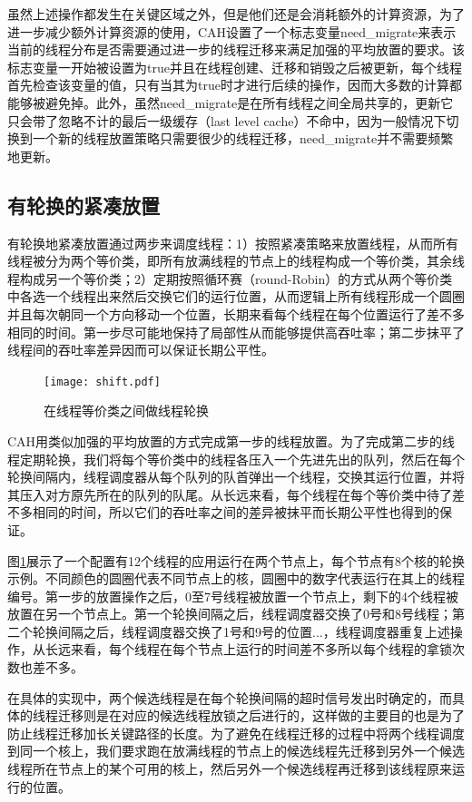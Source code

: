 虽然上述操作都发生在关键区域之外，但是他们还是会消耗额外的计算资源，为了进一步减少额外计算资源的使用，CAH设置了一个标志变量need\_migrate来表示当前的线程分布是否需要通过进一步的线程迁移来满足加强的平均放置的要求。该标志变量一开始被设置为true并且在线程创建、迁移和销毁之后被更新，每个线程首先检查该变量的值，只有当其为true时才进行后续的操作，因而大多数的计算都能够被避免掉。此外，虽然need\_migrate是在所有线程之间全局共享的，更新它只会带了忽略不计的最后一级缓存（last level cache）不命中，因为一般情况下切换到一个新的线程放置策略只需要很少的线程迁移，need\_migrate并不需要频繁地更新。
\subsection{有轮换的紧凑放置}
有轮换地紧凑放置通过两步来调度线程：1）按照紧凑策略来放置线程，从而所有线程被分为两个等价类，即所有放满线程的节点上的线程构成一个等价类，其余线程构成另一个等价类；2）定期按照循环赛（round-Robin）的方式从两个等价类中各选一个线程出来然后交换它们的运行位置，从而逻辑上所有线程形成一个圆圈并且每次朝同一个方向移动一个位置，长期来看每个线程在每个位置运行了差不多相同的时间。第一步尽可能地保持了局部性从而能够提供高吞吐率；第二步抹平了线程间的吞吐率差异因而可以保证长期公平性。
\begin{figure}[t]
	\centering
	\texttt{[image: shift.pdf]}
	\caption{在线程等价类之间做线程轮换}
	\label{Fig:shift}
\end{figure}

CAH用类似加强的平均放置的方式完成第一步的线程放置。为了完成第二步的线程定期轮换，我们将每个等价类中的线程各压入一个先进先出的队列，然后在每个轮换间隔内，线程调度器从每个队列的队首弹出一个线程，交换其运行位置，并将其压入对方原先所在的队列的队尾。从长远来看，每个线程在每个等价类中待了差不多相同的时间，所以它们的吞吐率之间的差异被抹平而长期公平性也得到的保证。

图\ref{Fig:shift}展示了一个配置有12个线程的应用运行在两个节点上，每个节点有8个核的轮换示例。不同颜色的圆圈代表不同节点上的核，圆圈中的数字代表运行在其上的线程编号。第一步的放置操作之后，0至7号线程被放置一个节点上，剩下的4个线程被放置在另一个节点上。第一个轮换间隔之后，线程调度器交换了0号和8号线程；第二个轮换间隔之后，线程调度器交换了1号和9号的位置...，线程调度器重复上述操作，从长远来看，每个线程在每个节点上运行的时间差不多所以每个线程的拿锁次数也差不多。

在具体的实现中，两个候选线程是在每个轮换间隔的超时信号发出时确定的，而具体的线程迁移则是在对应的候选线程放锁之后进行的，这样做的主要目的也是为了防止线程迁移加长关键路径的长度。为了避免在线程迁移的过程中将两个线程调度到同一个核上，我们要求跑在放满线程的节点上的候选线程先迁移到另外一个候选线程所在节点上的某个可用的核上，然后另外一个候选线程再迁移到该线程原来运行的位置。


